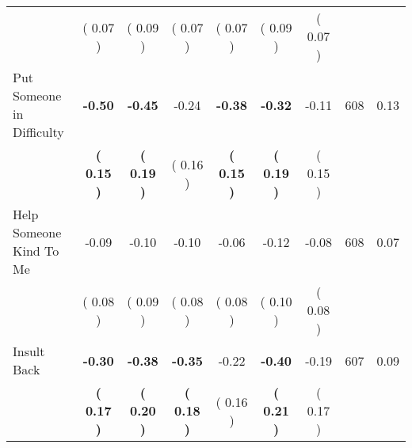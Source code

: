 \begin{tabular}{lcccccccc}
 & (     0.07 ) & (     0.09 ) & (     0.07 ) & (     0.07 ) & (     0.09 ) & (     0.07 ) & \\
Put Someone in Difficulty & \textbf{    -0.50} & \textbf{    -0.45} &     -0.24 & \textbf{    -0.38} & \textbf{    -0.32} &     -0.11 & 608 &       0.13 \\ 
 & \textbf{(     0.15 )} & \textbf{(     0.19 )} & (     0.16 ) & \textbf{(     0.15 )} & \textbf{(     0.19 )} & (     0.15 ) & \\
Help Someone Kind To Me &     -0.09 &     -0.10 &     -0.10 &     -0.06 &     -0.12 &     -0.08 & 608 &       0.07 \\ 
 & (     0.08 ) & (     0.09 ) & (     0.08 ) & (     0.08 ) & (     0.10 ) & (     0.08 ) & \\
Insult Back & \textbf{    -0.30} & \textbf{    -0.38} & \textbf{    -0.35} &     -0.22 & \textbf{    -0.40} &     -0.19 & 607 &       0.09 \\ 
 & \textbf{(     0.17 )} & \textbf{(     0.20 )} & \textbf{(     0.18 )} & (     0.16 ) & \textbf{(     0.21 )} & (     0.17 ) & \\
\bottomrule
\end{tabular}
